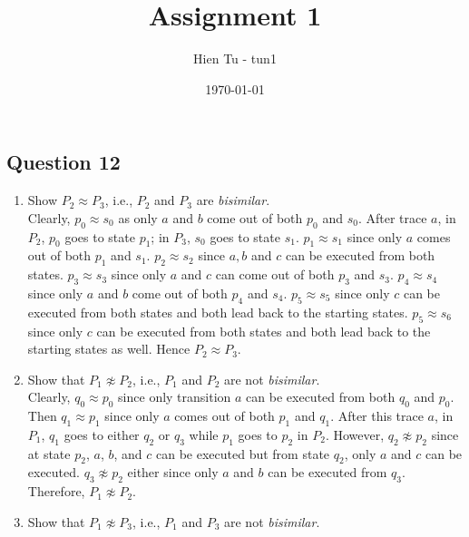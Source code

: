 \documentclass{article}
\title{Assignment 1}
\author{Hien Tu - tun1}
\date{\today}
\begin{document}
\maketitle

\subsection*{Question 12}
\begin{enumerate}[label=\alph*.]
    \item Show $P_2 \approx P_3$, i.e., $P_2$ and $P_3$ are \emph{bisimilar}. \\

        Clearly, $p_0 \approx s_0$ as only $a$ and $b$ come out of both $p_0$ and
        $s_0$. After trace $a$, in $P_2$, $p_0$ goes to state $p_1$; in $P_3$, 
        $s_0$ goes to state $s_1$. $p_1 \approx s_1$ since only $a$ comes out of
        both $p_1$ and $s_1$. $p_2 \approx s_2$ since $a, b$ and $c$ can be
        executed from both states. $p_3 \approx s_3$ since only $a$ and $c$ can
        come out of both $p_3$ and $s_3$. $p_4 \approx s_4$ since only $a$ and
        $b$ come out of both $p_4$ and $s_4$. $p_5 \approx s_5$ since only $c$
        can be executed from both states and both lead back to the starting
        states. $p_5 \approx s_6$ since only $c$ can be executed from both states
        and both lead back to the starting states as well. Hence $P_2 \approx P_3$. \\
    
    \item Show that $P_1 \not \approx P_2$, i.e., $P_1$ and $P_2$ are not
          \emph{bisimilar}. \\

        Clearly, $q_0 \approx p_0$ since only transition $a$ can be executed from
        both $q_0$ and $p_0$. Then $q_1 \approx p_1$ since only $a$ comes out of
        both $p_1$ and $q_1$. After this trace $a$, in $P_1$, $q_1$ goes to either
        $q_2$ or $q_3$ while $p_1$ goes to $p_2$ in $P_2$. However, $q_2 \not
        \approx p_2$ since at state $p_2$, $a$, $b$, and $c$ can be executed but
        from state $q_2$, only $a$ and $c$ can be executed. $q_3 \not \approx p_2$
        either since only $a$ and $b$ can be executed from $q_3$. Therefore,
        $P_1 \not \approx P_2$. \\

    \item Show that $P_1 \not \approx P_3$, i.e., $P_1$ and $P_3$ are not
          \emph{bisimilar}. \\


\end{enumerate}
\end{document}
